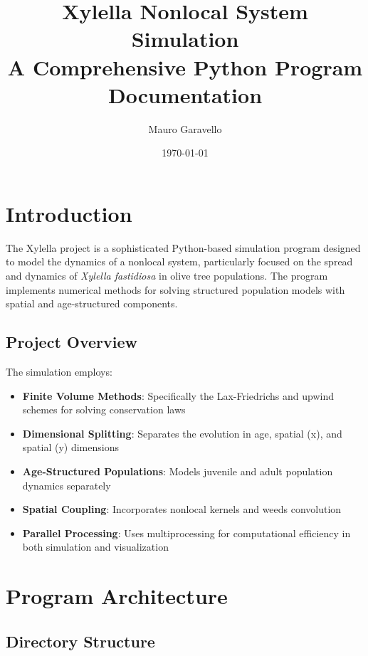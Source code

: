 \documentclass[12pt,a4paper]{report}
\title{\textbf{Xylella Nonlocal System Simulation} \\ \large A Comprehensive Python Program Documentation}
\author{Mauro Garavello}
\date{\today}
\begin{document}
\maketitle

\tableofcontents

\newpage

\chapter{Introduction}

The Xylella project is a sophisticated Python-based simulation program designed to model the dynamics of a nonlocal system, particularly focused on the spread and dynamics of \textit{Xylella fastidiosa} in olive tree populations. The program implements numerical methods for solving structured population models with spatial and age-structured components.

\section{Project Overview}

The simulation employs:
\begin{itemize}
    \item \textbf{Finite Volume Methods}: Specifically the Lax-Friedrichs and upwind schemes for solving conservation laws
    \item \textbf{Dimensional Splitting}: Separates the evolution in age, spatial (x), and spatial (y) dimensions
    \item \textbf{Age-Structured Populations}: Models juvenile and adult population dynamics separately
    \item \textbf{Spatial Coupling}: Incorporates nonlocal kernels and weeds convolution
    \item \textbf{Parallel Processing}: Uses multiprocessing for computational efficiency in both simulation and visualization
\end{itemize}

\chapter{Program Architecture}

\section{Directory Structure}
\end{document}
